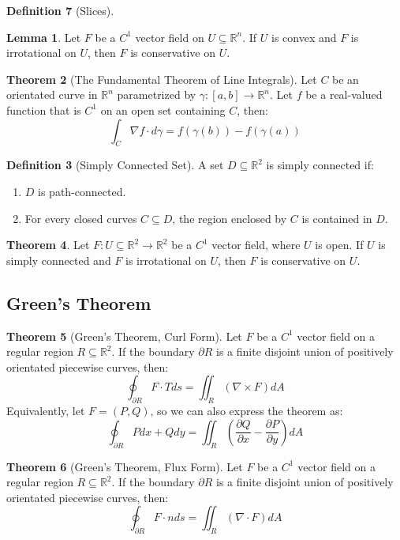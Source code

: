 \documentclass[12pt]{article}
\theoremstyle{definition}
\newtheorem{definition}{Definition}[subsection]
\newtheorem{lemma}[definition]{Lemma}
\newtheorem{theorem}[definition]{Theorem}
\theoremstyle{remark}
\begin{document}
\begin{definition}[Slices]
\begin{lemma}
Let $F$ be a $C^1$ vector field on $U\subseteq\mathbb{R}^n$. If $U$ is convex and $F$ is irrotational on $U$, then $F$ is conservative on $U$.
\end{lemma}

\begin{theorem}[The Fundamental Theorem of Line Integrals]
Let $C$ be an orientated curve in $\mathbb{R}^n$ parametrized by $\gamma:[a,b]\to\mathbb{R}^n$. Let $f$ be a real-valued function that is $C^1$ on an open set containing $C$, then:
\[
\int_C\nabla f\cdot d\gamma=f(\gamma(b))-f(\gamma(a))
\]
\end{theorem}

\begin{definition}[Simply Connected Set]
A set $D\subseteq\mathbb{R}^2$ is simply connected if:
\begin{enumerate}[label=(\alph*)]
\item $D$ is path-connected.
\item For every closed curves $C\subseteq D$, the region enclosed by $C$ is contained in $D$.
\end{enumerate}
\end{definition}

\begin{theorem}
Let $F:U\subseteq\mathbb{R}^2\to\mathbb{R}^2$ be a $C^1$ vector field, where $U$ is open. If $U$ is simply connected and $F$ is irrotational on $U$, then $F$ is conservative on $U$.
\end{theorem}

\subsection{Green's Theorem}
\begin{theorem}[Green's Theorem, Curl Form]
Let $F$ be a $C^1$ vector field on a regular region $R\subseteq\mathbb{R}^2$. If the boundary $\partial R$ is a finite disjoint union of positively orientated piecewise curves, then:
\[
\oint_{\partial R}F\cdot Tds=\iint_{R}(\nabla \times F)dA
\]
Equivalently, let $F=(P,Q)$, so we can also express the theorem as:
\[
\oint_{\partial R}Pdx+Qdy=\iint_R \left(\frac{\partial Q}{\partial x}-\frac{\partial P}{\partial y}\right)dA
\]
\end{theorem}

\begin{theorem}[Green's Theorem, Flux Form]
Let $F$ be a $C^1$ vector field on a regular region $R\subseteq \mathbb{R}^2$. If the boundary $\partial R$ is a finite disjoint union of positively orientated piecewise curves, then:
\[
\oint_{\partial R}F\cdot nds=\iint_R (\nabla\cdot F)dA
\]
\end{theorem}


\end{definition}
\end{document}
